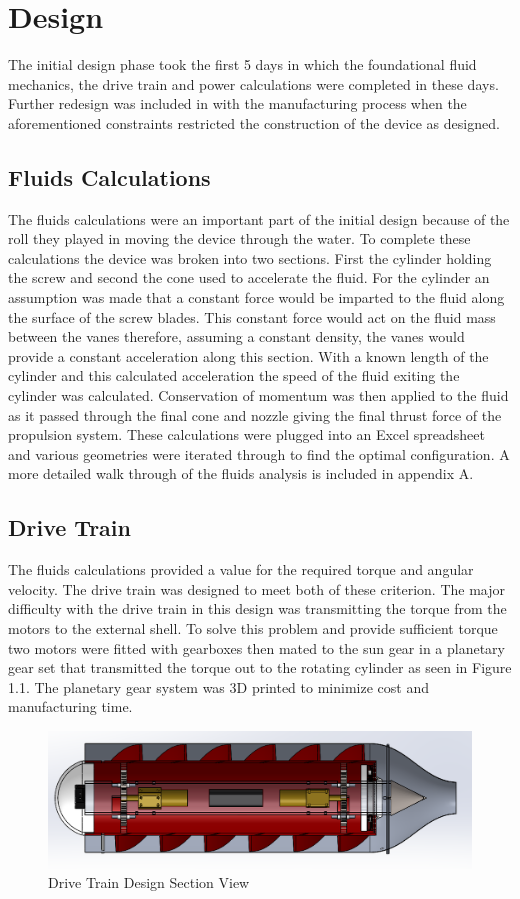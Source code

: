 \documentclass{report}
\begin{document}
\section{Design}
The initial design phase took the first 5 days in which the foundational fluid mechanics, the drive train and power calculations were completed in these days. Further redesign was included in with the manufacturing process when the aforementioned constraints restricted the construction of the device as designed.
\subsection{Fluids Calculations}
The fluids calculations were an important part of the initial design because of the roll they played in moving the device through the water. To complete these calculations the device was broken into two sections. First the cylinder holding the screw and second the cone used to accelerate the fluid. For the cylinder an assumption was made that a constant force would be imparted to the fluid along the surface of the screw blades. This constant force would act on the fluid mass between the vanes therefore, assuming a constant density, the vanes would provide a constant acceleration along this section. With a known length of the cylinder and this calculated acceleration the speed of the fluid exiting the cylinder was calculated. Conservation of momentum was then applied to the fluid as it passed through the final cone and nozzle giving the final thrust force of the propulsion system. These calculations were plugged into an Excel spreadsheet and various geometries were iterated through to find the optimal configuration. A more detailed walk through of the fluids analysis is included in appendix A.
\subsection{Drive Train}
The fluids calculations provided a value for the required torque and angular velocity. The drive train was designed to meet both of these criterion. The major difficulty with the drive train in this design was transmitting the torque from the motors to the external shell. To solve this problem and provide sufficient torque two motors were fitted with gearboxes then mated to the sun gear in a planetary gear set that transmitted the torque out to the rotating cylinder as seen in Figure 1.1. The planetary gear system was 3D printed to minimize cost and manufacturing time.
\begin{figure}[h]
\centering
\includegraphics[width=15cm]{"Section View"}
\caption{Drive Train Design Section View}
\end{figure}
\end{document}
